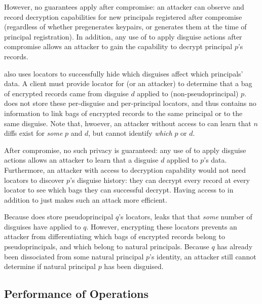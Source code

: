 However, no guarantees apply after compromise: an attacker can observe and record decryption
capabilities for new principals registered after compromise (regardless of whether \sys pregenerates
keypairs, or generates them at the time of principal registration). In addition, any use of
 to apply disguise actions after compromise allows an attacker to gain the capability to
decrypt principal $p$'s records.
%

\sys also uses locators to successfully hide which disguises affect which principals' data. A client
must provide locator  for \sys (or an attacker) to determine that a bag of encrypted
records came from disguise $d$ applied to (non-pseudoprincipal) $p$. \sys does not store these
per-disguise and per-principal locators, and thus contains no information to link bags of encrypted
records to the same principal or to the same disguise.  Note that, hwoever, an attacker without
access to  can learn that $n$ diffs exist for \emph{some} $p$ and $d$, but cannot identify
\emph{which} $p$ or $d$.

After compromise, no such privacy is guaranteed: any use of  to apply disguise actions
allows an attacker to learn that a disguise $d$ applied to $p$'s data.  Furthermore, an attacker
with access to decryption capability  would not need locators to discover $p$'s disguise
history: they can decrypt every record at every locator to see which bags they can successful
decrypt. Having access to  in addition to  just makes such an attack more
efficient.

Because \sys does store pseudoprincipal $q$'s locators, \sys leaks that that \emph{some} number of
disguises have applied to $q$.  However, encrypting these locators prevents an attacker from
differentiating which bags of encrypted records belong to pseudoprincipals, and which belong to
natural principals.  Because $q$ has already been dissociated from some natural principal $p$'s
identity, an attacker still cannot determine if natural principal $p$ has been disguised.


\subsection{Performance of \sys Operations}
\label{s:eval-ops}

